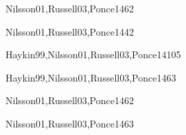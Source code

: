 \begin{syllabus}
\begin{unit}{\ISAgentsDef}{}{Nilsson01,Russell03,Ponce14}{6}{2}
    \ISAgentsAllTopics
    \ISAgentsAllObjectives
\end{unit}

\begin{unit}{\ISNaturalLanguageProcessingDef}{}{Nilsson01,Russell03,Ponce14}{4}{2}
    \ISNaturalLanguageProcessingAllTopics
    \ISNaturalLanguageProcessingAllObjectives
\end{unit}

\begin{unit}{\ISMachineLearningDef}{}{Haykin99,Nilsson01,Russell03,Ponce14}{10}{5}
    \ISMachineLearningAllTopics
    \ISMachineLearningAllObjectives
\end{unit}

\begin{unit}{\ISPlanningSystemsDef}{}{Haykin99,Nilsson01,Russell03,Ponce14}{6}{3}
    \ISPlanningSystemsAllTopics
    \ISPlanningSystemsAllObjectives
\end{unit}

\begin{unit}{\ISRoboticsDef}{}{Nilsson01,Russell03,Ponce14}{6}{2}
    \ISRoboticsAllTopics
    \ISRoboticsAllObjectives
\end{unit}

\begin{unit}{\ISPerceptionDef}{}{Nilsson01,Russell03,Ponce14}{6}{3}
    \ISPerceptionAllTopics
    \ISPerceptionAllObjectives
\end{unit}

\begin{coursebibliography}
\end{coursebibliography}

\end{syllabus}
